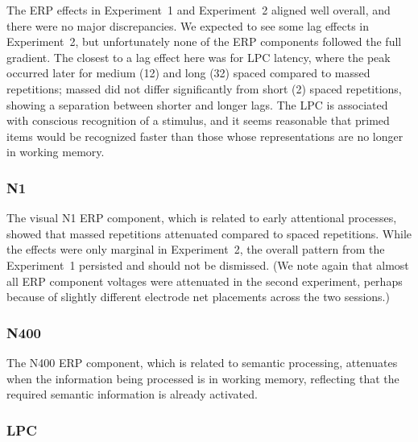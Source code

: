 The ERP effects in Experiment~1 and Experiment~2 aligned well overall, and there were no major discrepancies.  We expected to see some lag effects in Experiment~2, but unfortunately none of the ERP components followed the full gradient.  The closest to a lag effect here was for LPC latency, where the peak occurred later for medium (12) and long (32) spaced compared to massed repetitions; massed did not differ significantly from short (2) spaced repetitions, showing a separation between shorter and longer lags.  The LPC is associated with conscious recognition of a stimulus, and it seems reasonable that primed items would be recognized faster than those whose representations are no longer in working memory.

\subsubsection{N1}


The visual N1 ERP component, which is related to early attentional processes, showed that massed repetitions attenuated compared to spaced repetitions.  While the effects were only marginal in Experiment~2, the overall pattern from the Experiment~1 persisted and should not be dismissed. (We note again that almost all ERP component voltages were attenuated in the second experiment, perhaps because of slightly different electrode net placements across the two sessions.)

\subsubsection{N400}


The N400 ERP component, which is related to semantic processing, attenuates when the information being processed is in working memory, reflecting that the required semantic information is already activated.

\subsubsection{LPC}

